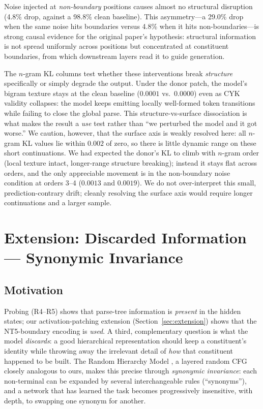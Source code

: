\documentclass[10pt,twocolumn]{article}
\begin{document}
Noise injected at \emph{non-boundary} positions causes almost no structural disruption (4.8\% drop, against a 98.8\% clean baseline). This asymmetry---a 29.0\% drop when the same noise hits boundaries versus 4.8\% when it hits non-boundaries---is strong causal evidence for the original paper's hypothesis: structural information is not spread uniformly across positions but concentrated at constituent boundaries, from which downstream layers read it to guide generation.

The $n$-gram KL columns test whether these interventions break \emph{structure} specifically or simply degrade the output. Under the donor patch, the model's bigram texture stays at the clean baseline ($0.0001$ vs.\ $0.0000$) even as CYK validity collapses: the model keeps emitting locally well-formed token transitions while failing to close the global parse. This structure-vs-surface dissociation is what makes the result a \emph{use} test rather than ``we perturbed the model and it got worse.'' We caution, however, that the surface axis is weakly resolved here: all $n$-gram KL values lie within $0.002$ of zero, so there is little dynamic range on these short continuations. We had expected the donor's KL to climb with $n$-gram order (local texture intact, longer-range structure breaking); instead it stays flat across orders, and the only appreciable movement is in the non-boundary noise condition at orders 3--4 ($0.0013$ and $0.0019$). We do not over-interpret this small, prediction-contrary drift; cleanly resolving the surface axis would require longer continuations and a larger sample.

\section{Extension: Discarded Information --- Synonymic Invariance}
\label{sec:synonymic}

\subsection{Motivation}

Probing (R4--R5) shows that parse-tree information is \emph{present} in the hidden states; our activation-patching extension (Section~\ref{sec:extension}) shows that the NT5-boundary encoding is \emph{used}. A third, complementary question is what the model \emph{discards}: a good hierarchical representation should keep a constituent's identity while throwing away the irrelevant detail of \emph{how} that constituent happened to be built. The Random Hierarchy Model \citep{cagnetta2024rhm}, a layered random CFG closely analogous to ours, makes this precise through \emph{synonymic invariance}: each non-terminal can be expanded by several interchangeable rules (``synonyms''), and a network that has learned the task becomes progressively insensitive, with depth, to swapping one synonym for another.
\end{document}
